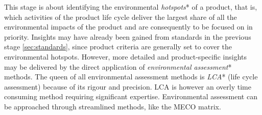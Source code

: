 \documentclass{article}
\begin{document}
This stage is about identifying the environmental \emph{hotspots}* of a product, that is, which activities of the product life cycle deliver the largest share of all the environmental impacts of the product and are consequently to be focused on in priority. Insights may have already been gained from standards in the previous stage \ref{sec:standards}, since product criteria are generally set to cover the environmental hotspots. However, more detailed and product-specific insights may be delivered by the direct application of \emph{environmental assessment}* methods. The queen of all environmental assessment methods is \emph{LCA}* (life cycle assessment) because of its rigour and precision. LCA is however an overly time consuming method requiring significant expertise. Environmental assessment can be approached through streamlined methods, like the MECO matrix. 
\end{document}
